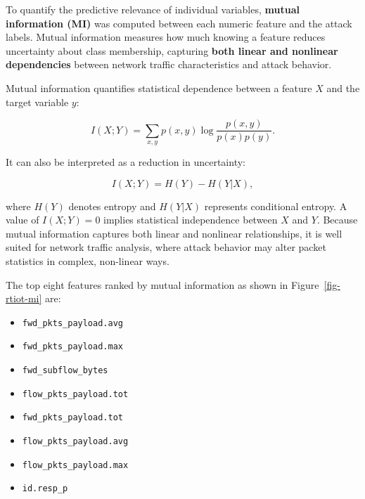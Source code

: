 \documentclass[
  letterpaper,
  DIV=11,
  numbers=noendperiod]{scrartcl}
\providecommand{\tightlist}{%
  \setlength{\itemsep}{0pt}\setlength{\parskip}{0pt}}
\begin{document}
To quantify the predictive relevance of individual variables,
\textbf{mutual information (MI)} was computed between each numeric
feature and the attack labels. Mutual information measures how much
knowing a feature reduces uncertainty about class membership, capturing
\textbf{both linear and nonlinear dependencies} between network traffic
characteristics and attack behavior.

Mutual information quantifies statistical dependence between a feature
\(X\) and the target variable \(y\):

\[
I(X;Y)=\sum_{x,y} p(x,y)\log\frac{p(x,y)}{p(x)p(y)}.
\]

It can also be interpreted as a reduction in uncertainty:

\[
I(X;Y)=H(Y)-H(Y|X),
\]

where \(H(Y)\) denotes entropy and \(H(Y|X)\) represents conditional
entropy. A value of \(I(X;Y)=0\) implies statistical independence
between \(X\) and \(Y\). Because mutual information captures both linear
and nonlinear relationships, it is well suited for network traffic
analysis, where attack behavior may alter packet statistics in complex,
non-linear ways.

The top eight features ranked by mutual information as shown in
Figure~\ref{fig-rtiot-mi} are:

\begin{itemize}
\tightlist
\item
  \texttt{fwd\_pkts\_payload.avg}
\item
  \texttt{fwd\_pkts\_payload.max}
\item
  \texttt{fwd\_subflow\_bytes}
\item
  \texttt{flow\_pkts\_payload.tot}
\item
  \texttt{fwd\_pkts\_payload.tot}
\item
  \texttt{flow\_pkts\_payload.avg}
\item
  \texttt{flow\_pkts\_payload.max}
\item
  \texttt{id.resp\_p}
\end{itemize}
\end{document}
